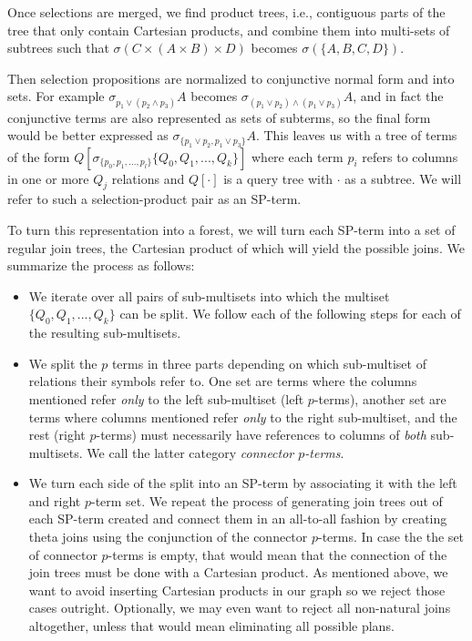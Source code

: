 Once selections are merged, we find product trees, i.e., contiguous
parts of the tree that only contain Cartesian products, and combine them
into multi-sets of subtrees such that \(\sigma(C \times (A \times B)
\times D)\) becomes \(\sigma(\{A,B,C,D\})\).

Then selection propositions are normalized to conjunctive normal form
and into sets. For example \(\sigma_{p_1 \lor (p_2 \land p_3)}A\)
becomes \(\sigma_{(p_1 \lor p_2) \land (p_1 \lor p_3)}A\), and in fact
the conjunctive terms are also represented as sets of subterms, so the
final form would be better expressed as \(\sigma_{\{p_1 \lor p_2,p_1
\lor p_3\}}A\). This leaves us with a tree of terms of the form
\(Q[\sigma_{\{p_0,p_1,...,p_l\}}\{Q_0,Q_1,...,Q_k\}]\) where each term
\(p_i\) refers to columns in one or more \(Q_j\) relations and
\(Q[\cdot]\) is a query tree with \(\cdot\) as a subtree. We will
refer to such a selection-product pair as an SP-term.

To turn this representation into a forest, we will turn each SP-term
into a set of regular join trees, the Cartesian product of which will
yield the possible joins. We summarize the process as follows:

\begin{itemize}
\item We iterate over all pairs of sub-multisets into which the
  multiset \(\{Q_0,Q_1,...,Q_k\}\) can be split. We follow each of the
  following steps for each of the resulting sub-multisets.
\item We split the \(p\) terms in three parts depending on which
  sub-multiset of relations their symbols refer to. One set are terms
  where the columns mentioned refer \emph{only} to the left
  sub-multiset (left \(p\)-terms), another set are terms where columns
  mentioned refer \emph{only} to the right sub-multiset, and the rest
  (right \(p\)-terms) must necessarily have references to columns of
  \emph{both} sub-multisets. We call the latter category
  \emph{connector \(p\)-terms}.
\item We turn each side of the split into an SP-term by associating it
  with the left and right \(p\)-term set. We repeat the process of
  generating join trees out of each SP-term created and connect them
  in an all-to-all fashion by creating theta joins using the
  conjunction of the connector \(p\)-terms. In case the the set of
  connector \(p\)-terms is empty, that would mean that the connection
  of the join trees must be done with a Cartesian product. As
  mentioned above, we want to avoid inserting Cartesian products in
  our graph so we reject those cases outright. Optionally, we may even
  want to reject all non-natural joins altogether, unless that would
  mean eliminating all possible plans.
\end{itemize}

